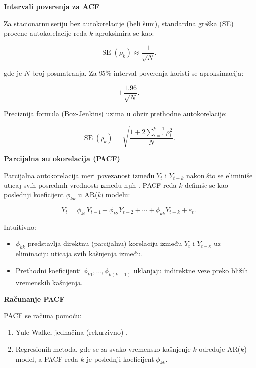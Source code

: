 \documentclass[12pt]{article}
\begin{document}
\bigskip

\noindent \textbf{Intervali poverenja za ACF}

Za stacionarnu seriju bez autokorelacije (beli šum), standardna greška (SE) procene autokorelacije reda $k$ aproksimira se kao:

\[
\operatorname{SE}(\rho_k) \approx \frac{1}{\sqrt{N}}.
\]

gde je $N$ broj posmatranja. Za 95\% interval poverenja koristi se aproksimacija:

\[
\pm \frac{1.96}{\sqrt{N}}.
\]

Preciznija formula (Box-Jenkins) uzima u obzir prethodne autokorelacije:

\[
\operatorname{SE}(\rho_k) = \sqrt{\frac{1 + 2 \sum_{i=1}^{k-1} \rho_i^2}{N}}.
\]


\bigskip

\noindent \textbf{Parcijalna autokorelacija (PACF)}

Parcijalna autokorelacija meri povezanost između $Y_t$ i $Y_{t-k}$ nakon što se eliminiše uticaj svih posrednih vrednosti između njih \cite{brockwell2002, hamilton1994}. PACF reda $k$ definiše se kao poslednji koeficijent $\phi_{kk}$ u AR($k$) modelu:

\[
Y_t = \phi_{k1} Y_{t-1}
     + \phi_{k2} Y_{t-2}
     + \cdots
     + \phi_{kk} Y_{t-k}
     + \varepsilon_t.
\]

Intuitivno:

\begin{itemize}
    \item $\phi_{kk}$ predstavlja direktnu (parcijalnu) korelaciju između $Y_t$ i $Y_{t-k}$ uz eliminaciju uticaja svih kašnjenja između.
    \item Prethodni koeficijenti $\phi_{k1}, \ldots, \phi_{k(k-1)}$ uklanjaju indirektne veze preko bližih vremenskih kašnjenja.
\end{itemize}

\bigskip

\noindent \textbf{Računanje PACF}

PACF se računa pomoću:

\begin{enumerate}
    \item Yule-Walker jednačina (rekurzivno) \cite{brockwell2002},
    \item Regresionih metoda, gde se za svako vremensko kašnjenje $k$ određuje AR($k$) model, a PACF reda $k$ je poslednji koeficijent $\phi_{kk}$.
\end{enumerate}
\end{document}

